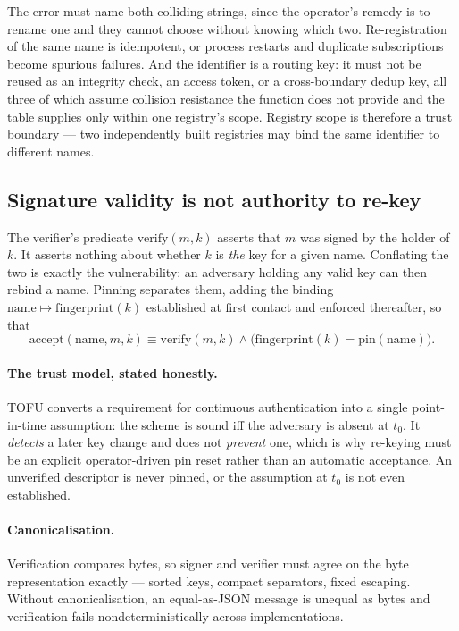 \documentclass[11pt]{article}
\begin{document}
The error must name both colliding strings, since the operator's remedy is to
rename one and they cannot choose without knowing which two. Re-registration of
the same name is idempotent, or process restarts and duplicate subscriptions
become spurious failures. And the identifier is a routing key: it must not be
reused as an integrity check, an access token, or a cross-boundary dedup key,
all three of which assume collision resistance the function does not provide
and the table supplies only within one registry's scope. Registry scope is
therefore a trust boundary --- two independently built registries may bind the
same identifier to different names.

\subsection{Signature validity is not authority to re-key}
\label{lbl:HS-IDENT-02}

The verifier's predicate $\mathrm{verify}(m, k)$ asserts that $m$ was signed by
the holder of $k$. It asserts nothing about whether $k$ is \emph{the} key for a
given name. Conflating the two is exactly the vulnerability: an adversary
holding any valid key can then rebind a name. Pinning separates them, adding
the binding $\mathrm{name} \mapsto \mathrm{fingerprint}(k)$ established at
first contact and enforced thereafter, so that
\begin{equation}
\mathrm{accept}(\mathrm{name}, m, k) \equiv \mathrm{verify}(m,k) \wedge
\big(\mathrm{fingerprint}(k) = \mathrm{pin}(\mathrm{name})\big).
\end{equation}

\paragraph{The trust model, stated honestly.} TOFU converts a requirement for
continuous authentication into a single point-in-time assumption: the scheme is
sound iff the adversary is absent at $t_0$. It \emph{detects} a later key change
and does not \emph{prevent} one, which is why re-keying must be an explicit
operator-driven pin reset rather than an automatic acceptance. An unverified
descriptor is never pinned, or the assumption at $t_0$ is not even established.

\paragraph{Canonicalisation.} Verification compares bytes, so signer and
verifier must agree on the byte representation exactly --- sorted keys, compact
separators, fixed escaping. Without canonicalisation, an equal-as-JSON message
is unequal as bytes and verification fails nondeterministically across
implementations.
\end{document}
